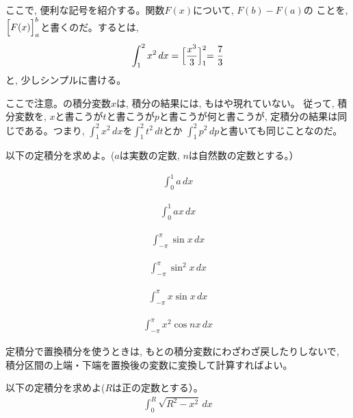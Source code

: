ここで, 便利な記号を紹介する。関数$F(x)$について, $F(b)-F(a)$の
ことを, $\Bigl[F(x)\Bigr]_a^b$と書くのだ。するとは, 
\begin{eqnarray}
\int_{1}^{2}x^2\,dx=\Bigl[\frac{x^3}{3}\Bigl]_{1}^{2}=\frac{7}{3}
\end{eqnarray}
と, 少しシンプルに書ける。

ここで注意。の積分変数$x$は, 積分の結果には, もはや現れていない。
従って, 積分変数を, $x$と書こうが$t$と書こうが$p$と書こうが何と書こうが, 
定積分の結果は同じである。つまり, $\int_{1}^{2}x^2\,dx$を$\int_{1}^{2}t^2\,dt$とか
$\int_{1}^{2}p^2\,dp$と書いても同じことなのだ。\mv

\begin{q}\label{q:int_teisekibun0} 以下の定積分を求めよ。($a$は実数の定数, $n$は自然数の定数とする。）
\begin{edaenumerate}
\item \begin{eqnarray*}\int_{0}^{1} a\, dx\end{eqnarray*}
\item \begin{eqnarray*}\int_{0}^{1} ax\, dx\end{eqnarray*}
\item \begin{eqnarray*}\int_{-\pi}^{\pi} \sin x\, dx\end{eqnarray*}
\item \begin{eqnarray*}\int_{-\pi}^{\pi} \sin^2 x\, dx\end{eqnarray*}
\item \begin{eqnarray*}\int_{-\pi}^{\pi} x \sin x\, dx\end{eqnarray*}
\item \begin{eqnarray*}\int_{-\pi}^{\pi} x^2 \cos nx\, dx\end{eqnarray*}
\end{edaenumerate}\end{q}
\vspace{0.3cm}

定積分で置換積分を使うときは, もとの積分変数にわざわざ戻したりしないで, 
積分区間の上端・下端を置換後の変数に変換して計算すればよい。

\begin{q}\label{q:int_teisekibun01} 以下の定積分を求めよ($R$は正の定数とする）。
\begin{eqnarray}\int_{0}^{R}\sqrt{R^2-x^2}\,dx\end{eqnarray}
\end{q}
\mv

